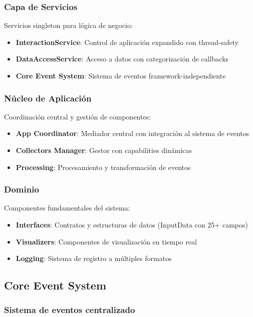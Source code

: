\subsubsection{Capa de Servicios}
Servicios singleton para lógica de negocio:
\begin{itemize}
    \item \textbf{InteractionService}: Control de aplicación expandido con thread-safety
    \item \textbf{DataAccessService}: Acceso a datos con categorización de callbacks
    \item \textbf{Core Event System}: Sistema de eventos framework-independiente
\end{itemize}

\subsubsection{Núcleo de Aplicación}
Coordinación central y gestión de componentes:
\begin{itemize}
    \item \textbf{App Coordinator}: Mediador central con integración al sistema de eventos
    \item \textbf{Collectors Manager}: Gestor con capabilities dinámicas
    \item \textbf{Processing}: Procesamiento y transformación de eventos
\end{itemize}

\subsubsection{Dominio}
Componentes fundamentales del sistema:
\begin{itemize}
    \item \textbf{Interfaces}: Contratos y estructuras de datos (InputData con 25+ campos)
    \item \textbf{Visualizers}: Componentes de visualización en tiempo real
    \item \textbf{Logging}: Sistema de registro a múltiples formatos
\end{itemize}

\subsection{Core Event System}
\label{subsec:core_event_system_input}

\subsubsection{Sistema de eventos centralizado}

